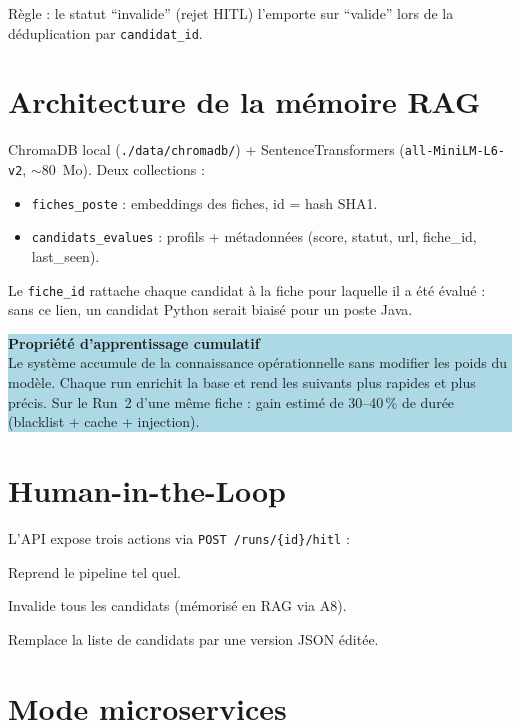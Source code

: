 \documentclass[12pt,a4paper]{report}
\begin{document}
Règle : le statut ``invalide'' (rejet HITL) l'emporte sur ``valide'' lors de la
déduplication par \texttt{candidat\_id}.

\section{Architecture de la mémoire RAG}

ChromaDB local (\texttt{./data/chromadb/}) + SentenceTransformers
(\texttt{all-MiniLM-L6-v2}, $\sim$80~Mo). Deux collections :

\begin{itemize}
  \item \texttt{fiches\_poste} : embeddings des fiches, id = hash SHA1.
  \item \texttt{candidats\_evalues} : profils + métadonnées (score, statut, url,
        fiche\_id, last\_seen).
\end{itemize}

Le \texttt{fiche\_id} rattache chaque candidat à la fiche pour laquelle il a été
évalué : sans ce lien, un candidat Python serait biaisé pour un poste Java.

\medskip
\colorbox{lightblue}{\parbox{0.95\textwidth}{\smallskip
\textbf{\color{primary}Propriété d'apprentissage cumulatif}\\
Le système accumule de la connaissance opérationnelle sans modifier les poids du
modèle. Chaque run enrichit la base et rend les suivants plus rapides et plus précis.
Sur le Run~2 d'une même fiche : gain estimé de 30--40\,\% de durée (blacklist +
cache + injection).
\smallskip}}

\section{Human-in-the-Loop}

L'API expose trois actions via \texttt{POST /runs/\{id\}/hitl} :
\begin{description}[noitemsep]
  \item[\texttt{approve}] Reprend le pipeline tel quel.
  \item[\texttt{skip}] Invalide tous les candidats (mémorisé en RAG via A8).
  \item[\texttt{edit}] Remplace la liste de candidats par une version JSON éditée.
\end{description}

\section{Mode microservices}
\end{document}
